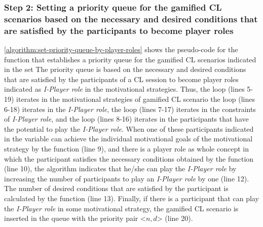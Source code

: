 \subsubsection*{Step 2: Setting a priority queue for the gamified CL scenarios based on the necessary and desired conditions that are satisfied by the participants to become player roles}

\autoref{algorithm:set-priority-queue-by-player-roles} shows the pseudo-code for the function  that establishes a priority queue  for the gamified CL scenarios indicated in the set  The priority queue is based on the necessary and desired conditions that are satisfied by the participants of a CL session  to become player roles indicated as \emph{I-Player role} in the motivational strategies. Thus, the loop  (lines 5-19) iterates in the motivational strategies of gamified CL scenario   the loop  (lines 6-18) iterates in the \emph{I-Player role}, the loop  (lines 7-17) iterates in the constraints of \emph{I-Player role}, and the loop  (lines 8-16) iterates in the participants that have the potential to play the \emph{I-Player role}. When one of these participants indicated in the variable  can achieve the individual motivational goals of the motivational strategy by the function  (line 9), and there is a player role as whole concept  in which the participant  satisfies the necessary conditions obtained by the function  (line 10), the algorithm indicates that he/she can play the \emph{I-Player role} by increasing the number of participants to play an \emph{I-Player role}  by one (line 12). The number of desired conditions  that are satisfied by the participant  is calculated by the function  (line 13). Finally, if there is a participant that can play the \emph{I-Player role} in some motivational strategy, the gamified CL scenario  is inserted in the queue  with the priority pair <$n,d$> (line 20).

